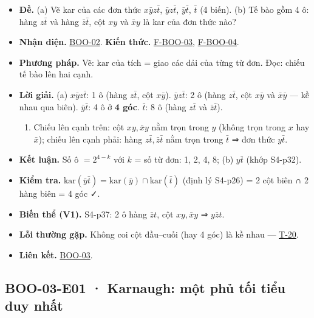 \documentclass[
  10pt,
  twoside,openany]{book}
\providecommand{\tightlist}{%
  \setlength{\itemsep}{0pt}\setlength{\parskip}{0pt}}
\begin{document}
\begin{itemize}
\tightlist
\item
  \textbf{Đề.} (a) Vẽ kar của các đơn thức \(x\bar yz\bar t\),
  \(\bar yz\bar t\), \(\bar y\bar t\), \(\bar t\) (4 biến). (b) Tế bào
  gồm 4 ô: hàng \(z\bar t\) và hàng \(\bar z\bar t\), cột \(xy\) và
  \(\bar xy\) là kar của đơn thức nào?
\item
  \textbf{Nhận diện.} \protect\hyperlink{BOO-02}{BOO-02}. \textbf{Kiến
  thức.} \protect\hyperlink{F-BOO-03}{F-BOO-03},
  \protect\hyperlink{F-BOO-04}{F-BOO-04}.
\item
  \textbf{Phương pháp.} Vẽ: \(\mathrm{kar}\) của tích = giao các dải của
  từng từ đơn. Đọc: chiếu tế bào lên hai cạnh.
\item
  \textbf{Lời giải.} (a) \(x\bar yz\bar t\): 1 ô (hàng \(z\bar t\), cột
  \(x\bar y\)). \(\bar yz\bar t\): 2 ô (hàng \(z\bar t\), cột
  \(x\bar y\) và \(\bar x\bar y\) --- kề nhau qua biên).
  \(\bar y\bar t\): 4 ô ở \textbf{4 góc}. \(\bar t\): 8 ô (hàng
  \(z\bar t\) và \(\bar z\bar t\)).

  \begin{enumerate}
  \def\labelenumi{(\alph{enumi})}
  \setcounter{enumi}{1}
  \tightlist
  \item
    Chiếu lên cạnh trên: cột \(xy,\bar xy\) nằm trọn trong \(y\) (không
    trọn trong \(x\) hay \(\bar x\)); chiếu lên cạnh phải: hàng
    \(z\bar t,\bar z\bar t\) nằm trọn trong \(\bar t\) ⇒ đơn thức
    \(y\bar t\).
  \end{enumerate}
\item
  \textbf{Kết luận.} Số ô \(=2^{4-k}\) với \(k\) = số từ đơn: 1, 2, 4,
  8; (b) \(y\bar t\) (khớp S4-p32).
\item
  \textbf{Kiểm tra.}
  \(\mathrm{kar}(\bar y\bar t)=\mathrm{kar}(\bar y)\cap\mathrm{kar}(\bar t)\)
  (định lý S4-p26) = 2 cột biên ∩ 2 hàng biên = 4 góc ✓.
\item
  \textbf{Biến thể (V1).} S4-p37: 2 ô hàng \(\bar zt\), cột
  \(xy,\bar xy\) ⇒ \(y\bar zt\).
\item
  \textbf{Lỗi thường gặp.} Không coi cột đầu--cuối (hay 4 góc) là kề
  nhau --- \protect\hyperlink{T-20}{T-20}.
\item
  \textbf{Liên kết.} \protect\hyperlink{BOO-03}{BOO-03}.
\end{itemize}

\hypertarget{BOO-03-E01}{%
\subsection{BOO-03-E01 · Karnaugh: một phủ tối tiểu duy
nhất}\label{BOO-03-E01}}
\end{document}
